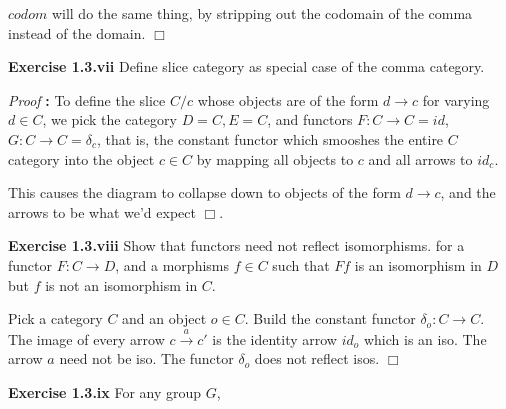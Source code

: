 \documentclass[11pt]{book}
\def\qed{$\Box$}
\newcommand{\beginproof}[1][]{\emph{Proof #1}\textbf{:} }
\newcommand{\question}[1]{\textbf{#1}}
\begin{document}
$codom$ will do the same thing, by stripping out the codomain of the comma instead of the domain. \qed

\question{Exercise 1.3.vii} Define slice category as special case of the comma category.


\beginproof To define the slice $C/c$ whose objects are of the form $d \rightarrow c$ for varying $d \in C$, we pick
the category $D = C, E = C$, and functors $F : C \rightarrow C = id$, $G : C \rightarrow C = \delta_c$, that is, the constant functor
which smooshes the entire $C$ category into the object $c \in C$ by mapping all objects to $c$ and all arrows to $id_{c}$.

This causes the diagram to collapse down to objects of the form $d \rightarrow c$, and the arrows to be what we'd expect \qed.

\question{Exercise 1.3.viii} Show that functors need not reflect isomorphisms. for a functor $F: C \rightarrow D$, and a 
morphisms $f \in C$ such that $F f$ is an isomorphism in $D$ but $f$ is not an isomorphism in $C$.


Pick a category $C$ and an object $o \in C$. Build the constant functor $\delta_o: C \rightarrow C$. The image
of every arrow $c \xrightarrow{a} c'$ is the identity arrow $id_o$ which is an iso. The arrow $a$ need not be iso. The functor
$\delta_o$ does not reflect isos. \qed

\question{Exercise 1.3.ix} For any group $G$, 
\end{document}
